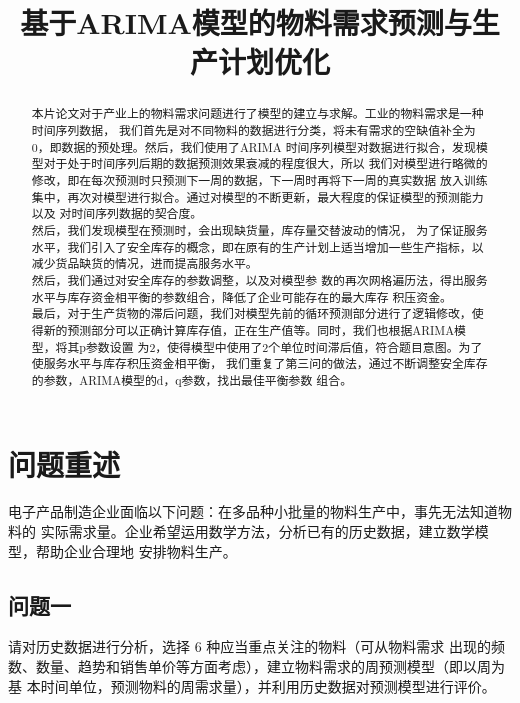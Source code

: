 \documentclass{cumcmthesis}
\title{基于ARIMA模型的物料需求预测与生产计划优化}
\begin{document}
        \maketitle
        \begin{abstract}
            本片论文对于产业上的物料需求问题进行了模型的建立与求解。工业的物料需求是一种时间序列数据，
            我们首先是对不同物料的数据进行分类，将未有需求的空缺值补全为0，即数据的预处理。然后，我们使用了ARIMA
            时间序列模型对数据进行拟合，发现模型对于处于时间序列后期的数据预测效果衰减的程度很大，所以
            我们对模型进行略微的修改，即在每次预测时只预测下一周的数据，下一周时再将下一周的真实数据
            放入训练集中，再次对模型进行拟合。通过对模型的不断更新，最大程度的保证模型的预测能力以及
            对时间序列数据的契合度。\\然后，我们发现模型在预测时，会出现缺货量，库存量交替波动的情况，
            为了保证服务水平，我们引入了安全库存的概念，即在原有的生产计划上适当增加一些生产指标，以
            减少货品缺货的情况，进而提高服务水平。\\然后，我们通过对安全库存的参数调整，以及对模型参
            数的再次网格遍历法，得出服务水平与库存资金相平衡的参数组合，降低了企业可能存在的最大库存
            积压资金。\\最后，对于生产货物的滞后问题，我们对模型先前的循环预测部分进行了逻辑修改，使
            得新的预测部分可以正确计算库存值，正在生产值等。同时，我们也根据ARIMA模型，将其p参数设置
            为2，使得模型中使用了2个单位时间滞后值，符合题目意图。为了使服务水平与库存积压资金相平衡，
            我们重复了第三问的做法，通过不断调整安全库存的参数，ARIMA模型的d，q参数，找出最佳平衡参数
            组合。

        \end{abstract}
        \tableofcontents
        \newpage
        \section{问题重述}
        电子产品制造企业面临以下问题：在多品种小批量的物料生产中，事先无法知道物料的
实际需求量。企业希望运用数学方法，分析已有的历史数据，建立数学模型，帮助企业合理地
安排物料生产。
        \subsection{问题一}
        请对历史数据进行分析，选择 6 种应当重点关注的物料（可从物料需求
出现的频数、数量、趋势和销售单价等方面考虑），建立物料需求的周预测模型（即以周为基
本时间单位，预测物料的周需求量），并利用历史数据对预测模型进行评价。
\end{document}
